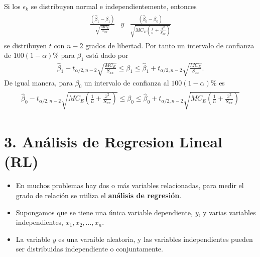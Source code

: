 Si los $\epsilon_{k}$ se distribuyen normal e independientemente, entonces
\begin{eqnarray*}
\begin{array}{ccc}
\frac{\left(\hat{\beta}_{1}-\beta_{1}\right)}{\sqrt{\frac{MC_{E}}{S_{xx}}}}&y &\frac{\left(\hat{\beta}_{0}-\beta_{0}\right)}{\sqrt{MC_{E}\left(\frac{1}{n}+\frac{\overline{x}^{2}}{S_{xx}}\right)}}
\end{array}
\end{eqnarray*}
se distribuyen $t$ con $n-2$ grados de libertad. Por tanto un intervalo de confianza de $100\left(1-\alpha\right)\%$ para $\beta_{1}$ est\'a dado por
\begin{eqnarray}
\hat{\beta}_{1}-t_{\alpha/2,n-2}\sqrt{\frac{MC_{E}}{S_{xx}}}\leq \beta_{1}\leq\hat{\beta}_{1}+t_{\alpha/2,n-2}\sqrt{\frac{MC_{E}}{S_{xx}}}.
\end{eqnarray}
De igual manera, para $\beta_{0}$ un intervalo de confianza al $100\left(1-\alpha\right)\%$ es
\small{
\begin{eqnarray}
\begin{array}{l}
\hat{\beta}_{0}-t_{\alpha/2,n-2}\sqrt{MC_{E}\left(\frac{1}{n}+\frac{\overline{x}^{2}}{S_{xx}}\right)}\leq\beta_{0}\leq\hat{\beta}_{0}+t_{\alpha/2,n-2}\sqrt{MC_{E}\left(\frac{1}{n}+\frac{\overline{x}^{2}}{S_{xx}}\right)}
\end{array}
\end{eqnarray}}



\section{3. An\'alisis de Regresion Lineal (RL)}



\begin{Note}
\begin{itemize}
\item En muchos problemas hay dos o m\'as variables relacionadas, para medir el grado de relaci\'on se utiliza el \textbf{an\'alisis de regresi\'on}. 
\item Supongamos que se tiene una \'unica variable dependiente, $y$, y varias  variables independientes, $x_{1},x_{2},\ldots,x_{n}$.

\item  La variable $y$ es una varaible aleatoria, y las variables independientes pueden ser distribuidas independiente o conjuntamente. 

\end{itemize}

\end{Note}





